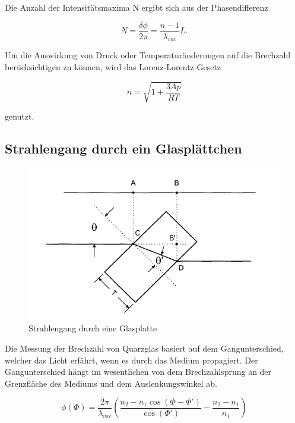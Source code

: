 Die Anzahl der Intensitätsmaxima N ergibt sich aus der Phasendifferenz

\begin{equation}
N=\frac{\delta \phi}{2 \pi} = \frac{n-1}{\lambda_{vac}} L.
\end{equation}

Um die Auswirkung von Druck oder Temperaturänderungen auf die Brechzahl berücksichtigen zu können, wird das Lorenz-Lorentz Gesetz

\begin{equation}
	n = \sqrt{1 + \frac{3Ap}{RT}}
	\label{n_gas}
\end{equation}

genutzt.

\subsection{Strahlengang durch ein Glasplättchen}

\begin{figure}[h]
\centering
\includegraphics[scale=0.8]{img/glasPlatte.PNG}
\caption{Strahlengang durch eine Glasplatte}
\label{Glasplatte}
\end{figure}

Die Messung der Brechzahl von Quarzglas basiert auf dem Gangunterschied, welcher das Licht erfährt, wenn es durch das Medium propagiert.
Der Gangunterschied hängt im wesentlichen von dem Brechzahlsprung an der Grenzfläche des Mediums und dem Auslenkungswinkel ab.

\begin{equation}
\phi(\Phi) = \frac{2 \pi}{\lambda_{vac}} \left( \frac{n_2 - n_1 \cos(\Phi - \Phi')}{\cos(\Phi')} - \frac{n_2 - n_1}{n_1}\right)
\end{equation}

